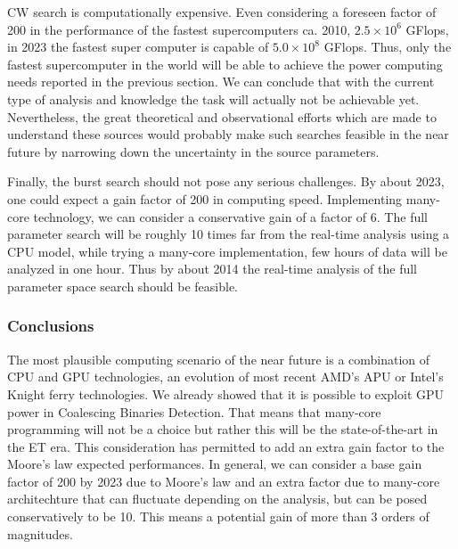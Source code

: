 CW search is computationally expensive.  Even considering a foreseen factor of 
200 in the  performance of the  fastest supercomputers ca. 2010,
$2.5 \times 10^6 $ GFlops, in 2023 the fastest super computer is capable of $5.0 
\times 10^8 $ GFlops. 
Thus, only the fastest supercomputer in the world will be able to achieve the 
power computing needs reported in the previous section.
We can conclude that with the current type of analysis and knowledge the
task will actually not be achievable yet. Nevertheless, the great theoretical 
and observational  efforts which are made to understand 
these sources would  probably make such searches feasible in the near future by 
narrowing down the uncertainty in the source parameters.

Finally, the burst search should not pose any serious challenges.
By about 2023, one could expect a gain factor of 200 in computing
speed.  Implementing many-core technology, we can consider a conservative 
gain of a factor of 6.  The full parameter search will be roughly 10 times far 
from the real-time analysis using a CPU model, while trying a many-core 
implementation, few hours of data will be analyzed in one hour. Thus by about  
2014 the real-time analysis of the full parameter space search should 
be feasible.  

\FloatBarrier
\subsubsection{Conclusions}


The most plausible computing scenario of the near future is a combination of 
CPU and GPU technologies, an evolution of most recent AMD's APU or Intel's 
Knight ferry technologies.  We already showed that it is possible to exploit 
GPU power in Coalescing Binaries Detection. That means that many-core 
programming will not be a choice but rather this will be the state-of-the-art 
in the ET era. This consideration has permitted to add an extra gain factor to the 
Moore's law expected performances. In general, we can consider a base gain 
factor of 200 by 2023 due to Moore's law and an extra factor due to
many-core architechture that can fluctuate depending on the analysis, but 
can be posed conservatively  to be 10.  This means a potential gain of more 
than 3 orders of magnitudes.


